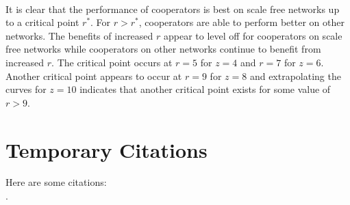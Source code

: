 \documentclass{article}
\begin{document}
	\paragraph{}It is clear that the performance of cooperators is best on scale free networks up to a critical point $r^*$.  For $r>r^*$, cooperators are able to perform better on other networks.  The benefits of increased $r$ appear to level off for cooperators on scale free networks while cooperators on other networks continue to benefit from increased $r$.  The critical point occurs at $r=5$ for $z=4$ and $r=7$ for $z=6$.  Another critical point appears to occur at $r=9$ for $z=8$ and extrapolating the curves for $z=10$ indicates that another critical point exists for some value of $r>9$.

    \section{Temporary Citations}
    Here are some citations: \cite{Axelrod1981}\cite{Nowak1992}\cite{Hauert2004}\cite{Pacheco2005}\cite{Santos2006b}\cite{Santos2006a}\cite{Santos2005a}\cite{Santos2006c}\cite{Santos2005b}\cite{Eguiluz2005}\cite{Santos2006d}\cite{Fu2008}\cite{Traulsen2006}\cite{Watts1998}\cite{Barabasi1999}\cite{Amaral2000}\cite{Molloy1995}\\\cite{Maslov2002}\cite{Dorogovtsev2003}\cite{Dorogovtsev2001}\cite{Nowak1998}\cite{Boyd1988}\cite{Boyd1992}\cite{Hauert2002}\cite{Hauert2007}\cite{Li2014}\cite{Maloney2015a}\cite{Ohtsuki2006}\cite{Macy1991}.
    
    
    
\end{document}
